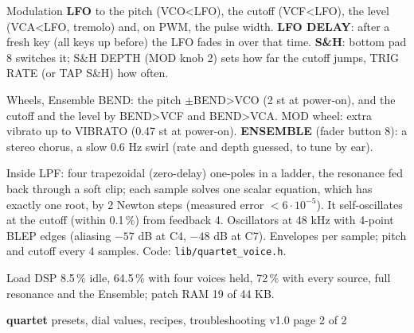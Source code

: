 \documentclass{article}
\newcommand{\FL}[1]{\textcolor{fltc}{#1}}
\newcommand{\EN}[1]{\textcolor{ensc}{#1}}
\begin{document}
\begin{minipage}[t]{66mm}\vspace{0pt}
\begin{card}{Modulation}
\textbf{LFO} to the pitch (VCO<LFO), the cutoff (VCF<LFO), the level (VCA<LFO, tremolo) and,
on PWM, the pulse width. \textbf{LFO DELAY}: after a fresh key (all keys up before) the LFO fades in
over that time. \FL{\textbf{S\&H}}: bottom pad 8 switches it; S\&H DEPTH (MOD knob 2) sets how
far the cutoff jumps, TRIG RATE (or TAP S\&H) how often.
\end{card}
\begin{card}{Wheels, Ensemble}
BEND: the pitch \(\pm\)BEND>VCO (2 st at power-on), and the cutoff and the level by BEND>VCF and
BEND>VCA. MOD wheel: extra vibrato up to VIBRATO (0.47 st at power-on). \EN{\textbf{ENSEMBLE}}
(fader button 8): a stereo chorus, a slow 0.6 Hz swirl (rate and depth guessed, to tune by ear).
\end{card}
\end{minipage}\hfill
\begin{minipage}[t]{68mm}\vspace{0pt}
\begin{card}{Inside}
\fontsize{6.6}{7.8}\selectfont
LPF: four trapezoidal (zero-delay) one-poles in a ladder, the resonance fed back through a soft
clip; each sample solves one scalar equation, which has exactly one root, by 2 Newton steps
(measured error \(< 6\cdot10^{-5}\)). It self-oscillates at the cutoff (within 0.1\,\%) from
feedback 4. Oscillators at 48 kHz with 4-point BLEP edges (aliasing \(-57\) dB at C4, \(-48\) dB
at C7). Envelopes per sample; pitch and cutoff every 4 samples. Code: \texttt{lib/quartet\_voice.h}.
\end{card}
\begin{card}{Load}
DSP 8.5\,\% idle, 64.5\,\% with four voices held, 72\,\% with every source, full resonance and
the Ensemble; patch RAM 19 of 44 KB.
\end{card}
\end{minipage}

\newpage
{\fontsize{16}{18}\selectfont\bfseries quartet}\hspace{3mm}%
{\fontsize{9.5}{11}\selectfont presets, dial values, recipes, troubleshooting}\hfill
{\fontsize{7}{8}\selectfont\color{black!55} v1.0 \textperiodcentered{} page 2 of 2}
\end{document}
